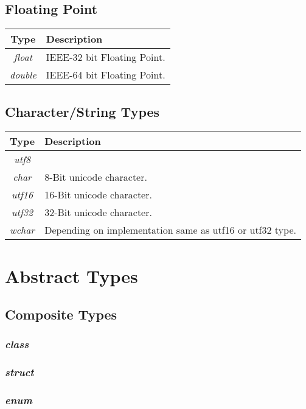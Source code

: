 \documentclass[10pt,a4paper]{article}
\begin{document}
\subsection{Floating Point}

\begin{tabular}{c|l}
Type			& Description \\ \hline
\textit{float}	& IEEE-32 bit Floating Point. \\
\textit{double}	& IEEE-64 bit Floating Point. \\
\end{tabular}


\subsection{Character/String Types}


\begin{tabular}{c|l}
Type			& Description\\ \hline
\textit{utf8}	&  \\
\textit{char}	& 8-Bit unicode character. \\

\textit{utf16}	& 16-Bit unicode character. \\
\textit{utf32}	& 32-Bit unicode character. \\
\textit{wchar}	& Depending on implementation same as utf16 or utf32 type. \\
\end{tabular}




\section{Abstract Types}


\subsection{Composite Types}

\subsubsection{\textit{class}}
\subsubsection{\textit{struct}}
\subsubsection{\textit{enum}}
\end{document}
